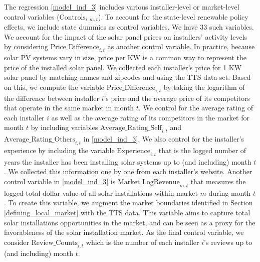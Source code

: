 \documentclass[mnsc,blindrev]{informs3}
\begin{document}
	
	The regression \eqref{model_ind_3} includes various installer-level or market-level control variables ($\text{Controls}_{i,m,t}$).  To account for the state-level renewable policy effects, we include state dummies as control variables. We have 33 such variables. We account for the impact of the solar panel prices on installers' activity levels by considering $\text{Price\_Difference}_{i,t}$ as another control variable.  In practice, because solar PV systems vary in size, price per KW is a common way to represent the price of the installed solar panel. We collected each installer's price for 1 KW solar panel by matching names and zipcodes and using the TTS data set. Based on this, we compute the variable $\text{Price\_Difference}_{i,t}$ by taking the logarithm of the difference between installer $i$'s price and the average price of its competitors that operate in the same market in month $t$.  We control for the average rating of each installer $i$ as well as the average rating of its competitors in the market for month $t$ by including variables $\text{Average\_Rating\_Self}_{i,t}$ and $\text{Average\_Rating\_Others}_{i,t}$ in \eqref{model_ind_3}. We also control for the installer's experience by including the variable $\text{Experience}_{i,t}$ that is the logged number of years the installer has been installing solar systems up to (and including) month $t$. We collected this information one by one from each installer's website. Another control variable in \eqref{model_ind_3} is $\text{Market\_LogRevenue}_{m,t}$  that measures the logged total dollar value of all solar installations within market $m$ during month $t$. To create this variable, we augment the market boundaries identified in Section \ref{defining_local_market} with the TTS data. This variable aims to capture total solar installations opportunities in the market, and can be seen as a proxy for the favorableness of the solar installation market. As the final control variable, we consider  $\text{Review\_Counts}_{i,t}$ which is the number of each installer $i$'s reviews up to (and including) month $t$.
	
	
	
	
	
\end{document}
